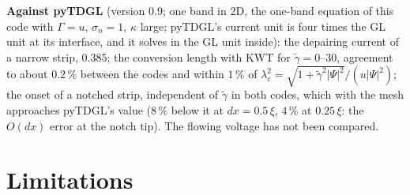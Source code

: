 \documentclass[11pt,a4paper]{article}
\newcommand{\gt}{\tilde\gamma}
\begin{document}
\textbf{Against pyTDGL} (version 0.9; one band in 2D, the one-band equation of this code with $\Gamma = u$, $\sigma_n =
1$, $\kappa$ large; pyTDGL's current unit is four times the GL unit at its interface, and it solves in the GL unit inside):
the depairing current of a narrow strip, $0.385$; the conversion length with KWT for $\gt = 0$--30, agreement to about $0.2\,\%$ between the
codes and within $1\,\%$ of $\lambda_c^2 = \sqrt{1+\gt^2|\Psi|^2}/(u|\Psi|^2)$; the onset of a notched strip, independent of
$\gt$ in both codes, which with the mesh approaches pyTDGL's value ($8\,\%$ below it at $dx = 0.5\,\xi$, $4\,\%$ at
$0.25\,\xi$: the $O(dx)$ error at the notch tip). The flowing voltage has not been compared.

\section{Limitations}
\end{document}
